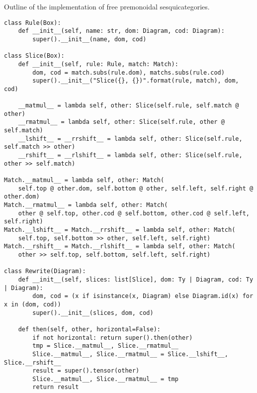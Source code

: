 \begin{python}\label{listing:free-monoidal-2-category}
{\normalfont Outline of the implementation of free premonoidal sesquicategories.}

\begin{verbatim}
class Rule(Box):
    def __init__(self, name: str, dom: Diagram, cod: Diagram):
        super().__init__(name, dom, cod)

class Slice(Box):
    def __init__(self, rule: Rule, match: Match):
        dom, cod = match.subs(rule.dom), matchs.subs(rule.cod)
        super().__init__("Slice({}, {})".format(rule, match), dom, cod)

    __matmul__ = lambda self, other: Slice(self.rule, self.match @ other)
    __rmatmul__ = lambda self, other: Slice(self.rule, other @ self.match)
    __lshift__ = __rrshift__ = lambda self, other: Slice(self.rule, self.match >> other)
    __rshift__ = __rlshift__ = lambda self, other: Slice(self.rule, other >> self.match)

Match.__matmul__ = lambda self, other: Match(
    self.top @ other.dom, self.bottom @ other, self.left, self.right @ other.dom)
Match.__rmatmul__ = lambda self, other: Match(
    other @ self.top, other.cod @ self.bottom, other.cod @ self.left, self.right)
Match.__lshift__ = Match.__rrshift__ = lambda self, other: Match(
    self.top, self.bottom >> other, self.left, self.right)
Match.__rshift__ = Match.__rlshift__ = lambda self, other: Match(
    other >> self.top, self.bottom, self.left, self.right)

class Rewrite(Diagram):
    def __init__(self, slices: list[Slice], dom: Ty | Diagram, cod: Ty | Diagram):
        dom, cod = (x if isinstance(x, Diagram) else Diagram.id(x) for x in (dom, cod))
        super().__init__(slices, dom, cod)

    def then(self, other, horizontal=False):
        if not horizontal: return super().then(other)
        tmp = Slice.__matmul__, Slice.__rmatmul__
        Slice.__matmul__, Slice.__rmatmul__ = Slice.__lshift__, Slice.__rshift__
        result = super().tensor(other)
        Slice.__matmul__, Slice.__rmatmul__ = tmp
        return result
\end{verbatim}
\end{python}


